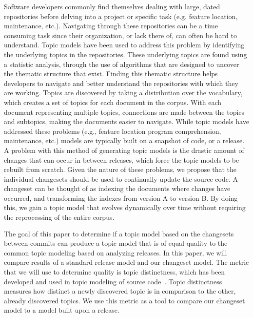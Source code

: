 Software developers commonly find themselves dealing with large, dated repositories before delving into a project or specific task (e.g. feature location, maintenance, etc.).
Navigating through these repositories can be a time consuming task since their organization, or lack there of, can often be hard to understand.
Topic models have been used to address this problem by identifying the underlying topics in the repositories.
These underlying topics are found using a statistic analysis, through the use of algorithms that are designed to uncover the thematic structure that exist.
Finding this thematic structure helps developers to navigate and better understand the repositories with which they are working.
Topics are discovered by taking a distribution over the vocabulary, which creates a set of topics for each document in the corpus.
With each document representing multiple topics, connections are made between the topics and subtopics, making the documents easier to navigate.
While topic models have addressed these problems (e.g., feature location program comprehension, maintenance, etc.) models are typically built on a snapshot of code, or a release.
A problem with this method of generating topic models is the drastic amount of changes that can occur in between releases, which force the topic models to be rebuilt from scratch.
Given the nature of these problems, we propose that the individual changesets should be used to continually update the source code.
A changeset can be thought of as indexing the documents where changes have occurred, and transforming the indexes from version A to version B.
By doing this, we gain a topic model that evolves dynamically over time without requiring the reprocessing of the entire corpus.

The goal of this paper to determine if a topic model based on the changesets between commits can produce a topic model that is of equal quality to the common topic modeling based on analyzing releases.
In this paper, we will compare results of a standard release model and our changeset model.
The metric that we will use to determine quality is topic distinctness,
which has been developed and used in topic modeling of source
code~\cite{Wei-etal:2010, Thomas-etal:2011, Chuang-etal:2012}.
Topic distinctness measures how distinct a newly discovered topic is in
comparison to the other, already discovered topics.
We use this metric as a  tool to compare our changeset model to a model built upon a release.




